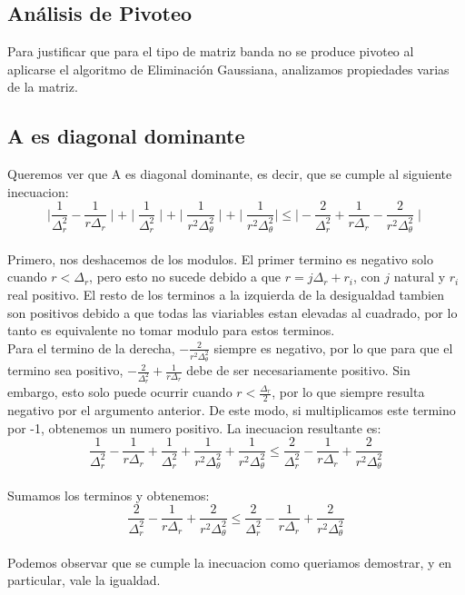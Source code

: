 \subsection{Análisis de Pivoteo}

Para justificar que para el tipo de matriz banda no se produce pivoteo al aplicarse el algoritmo de Eliminación Gaussiana, analizamos propiedades varias de la matriz.


\subsection{A es diagonal dominante}
Queremos ver que A es diagonal dominante, es decir, que se cumple al siguiente inecuacion:\\
$$\mid \frac{1}{\Delta^2_r}-\frac{1}{r \Delta_r}\mid +
\mid \frac{1}{\Delta^2_r} \mid + 
\mid \frac{1}{r^2 \Delta^2_\theta} \mid +
\mid \frac{1}{r^2 \Delta^2_\theta} \mid
\leq \mid -\frac{2}{\Delta^2_r}+\frac{1}{r \Delta_r}-\frac{2}{r^2 \Delta^2_\theta} \mid$$  \\
Primero, nos deshacemos de los modulos. El primer termino es negativo solo cuando $r < {\Delta_r}$, pero esto no sucede debido a que $r= j \Delta_r + r_i$, con $j$ natural y $r_i$ real positivo. El resto de los terminos a la izquierda de la desigualdad tambien son positivos debido a que todas las viariables estan elevadas al cuadrado, por lo tanto es equivalente no tomar modulo para estos terminos. \\
Para el termino de la derecha, $-\frac{2}{r^2 \Delta^2_\theta}$ siempre es negativo, por lo que para que el termino sea positivo, $-\frac{2}{\Delta^2_r}+\frac{1}{r \Delta_r}$ debe de ser necesariamente positivo. Sin embargo, esto solo puede ocurrir cuando $r < \frac{\Delta_r}{2}$, por lo que siempre resulta negativo por el argumento anterior. De este modo, si multiplicamos este termino por -1, obtenemos un numero positivo. La inecuacion resultante es: \\ 
$$ \frac{1}{\Delta^2_r}-\frac{1}{r \Delta_r} +  
\frac{1}{\Delta^2_r} + 
\frac{1}{r^2 \Delta^2_\theta} +
\frac{1}{r^2 \Delta^2_\theta}
\leq \frac{2}{\Delta^2_r}-\frac{1}{r \Delta_r}+\frac{2}{r^2 \Delta^2_\theta}$$ \\

Sumamos los terminos y obtenemos: \\
$$\frac{2}{\Delta^2_r}-\frac{1}{r \Delta_r}+\frac{2}{r^2 \Delta^2_\theta} \leq \frac{2}{\Delta^2_r}-\frac{1}{r \Delta_r}+\frac{2}{r^2 \Delta^2_\theta}$$ \\
Podemos observar que se cumple la inecuacion como queriamos demostrar, y en particular, vale la igualdad.


